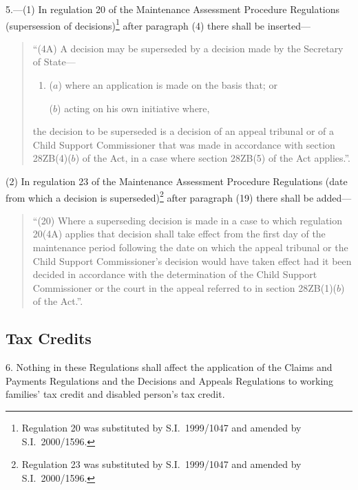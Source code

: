 \documentclass[12pt,a4paper]{article}
\begin{document}
5.---(1)  In regulation 20 of the Maintenance Assessment Procedure Regulations (supersession of decisions)\footnote{Regulation 20 was substituted by S.I.\ 1999/1047 and amended by S.I.\ 2000/1596.} after paragraph (4) there shall be inserted—
\begin{quotation}
“(4A) A decision may be superseded by a decision made by the Secretary of State—
\begin{enumerate}\item[]
($a$) where an application is made on the basis that; or

($b$) acting on his own initiative where,
\end{enumerate}
the decision to be superseded is a decision of an appeal tribunal or of a Child Support Commissioner that was made in accordance with section 28ZB(4)($b$)  of the Act, in a case where section 28ZB(5) of the Act applies.”.
\end{quotation}

(2) In regulation 23 of the Maintenance Assessment Procedure Regulations (date from which a decision is superseded)\footnote{Regulation 23 was substituted by S.I.\ 1999/1047 and amended by S.I.\ 2000/1596.} after paragraph (19) there shall be added—
\begin{quotation}
“(20) Where a superseding decision is made in a case to which regulation 20(4A) applies that decision shall take effect from the first day of the maintenance period following the date on which the appeal tribunal or the Child Support Commissioner’s decision would have taken effect had it been decided in accordance with the determination of the Child Support Commissioner or the court in the appeal referred to in section 28ZB(1)($b$)  of the Act.”.
\end{quotation}

\subsection[6. Tax Credits]{Tax Credits}

6.  Nothing in these Regulations shall affect the application of the Claims and Payments Regulations and the Decisions and Appeals Regulations to working families' tax credit and disabled person’s tax credit. 


\bigskip
\end{document}
